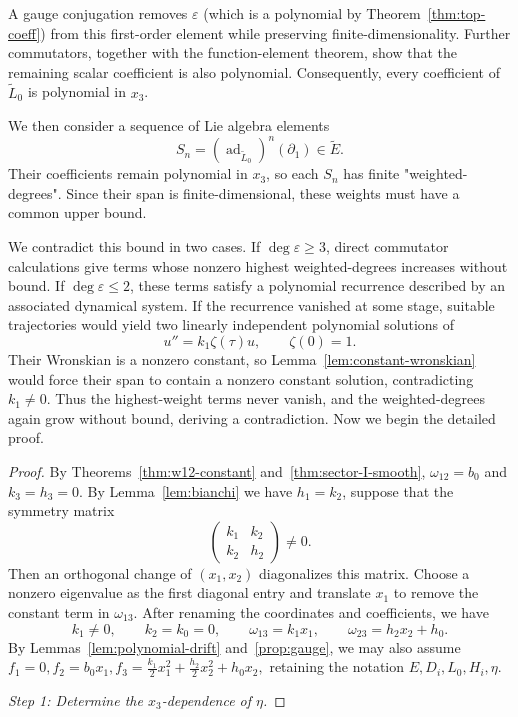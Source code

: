 \documentclass{tCON2e}
\newenvironment{revision}{\begingroup\color{black}}{\endgroup}
\numberwithin{equation}{section}
\theoremstyle{journalplain}
\theoremstyle{journaldef}
\newenvironment{revision}{}{}
\begin{document}
\begin{revision}
A gauge conjugation removes $\varepsilon$ (which is a polynomial by Theorem~\ref{thm:top-coeff}) from this first-order
element while preserving finite-dimensionality.
Further commutators, together with the function-element theorem,
show that the remaining scalar coefficient is also polynomial.
Consequently, every coefficient of $\widetilde L_0$ is polynomial
in $x_3$.

We then consider a sequence of Lie algebra elements
\[
S_n=(\operatorname{ad}_{\widetilde L_0})^n(\partial_1)
\in\widetilde E.
\]
Their coefficients remain polynomial in $x_3$, so each $S_n$
has finite "weighted-degrees". Since their span is finite-dimensional,
these weights must have a common upper bound.

We contradict this bound in two cases.
If $\deg\varepsilon\ge3$, direct commutator calculations give
terms whose nonzero highest weighted-degrees increases without bound.
If $\deg\varepsilon\le2$, these terms satisfy a polynomial recurrence
described by an associated dynamical system.
If the recurrence vanished at some stage, suitable trajectories
would yield two linearly independent polynomial solutions of
\[
u''=k_1\zeta(\tau)u,\qquad \zeta(0)=1.
\]
Their Wronskian is a nonzero constant, so
Lemma~\ref{lem:constant-wronskian} would force their span to
contain a nonzero constant solution, contradicting $k_1\ne0$.
Thus the highest-weight terms never vanish, and the weighted-degrees
again grow without bound, deriving a contradiction. Now we begin the detailed proof.

\begin{proof}
By Theorems~\ref{thm:w12-constant} and~\ref{thm:sector-I-smooth},
$\omega_{12}=b_0$ and $k_3=h_3=0$. By Lemma~\ref{lem:bianchi} we have $h_1 = k_2$,
suppose that the symmetry matrix
\[
\begin{pmatrix}k_1&k_2\\k_2&h_2\end{pmatrix}\ne0.
\]
Then an orthogonal change of $(x_1,x_2)$ diagonalizes this matrix.
Choose a nonzero eigenvalue as the first diagonal entry and
translate $x_1$ to remove the constant term in $\omega_{13}$.
After renaming the coordinates and coefficients, we have
\[
k_1\ne0,\qquad k_2=k_0=0,\qquad
\omega_{13}=k_1x_1,\qquad \omega_{23}=h_2x_2+h_0.
\]
By Lemmas~\ref{lem:polynomial-drift} and~\ref{prop:gauge},
we may also assume
\(
f_1=0,f_2=b_0x_1,
f_3=\frac{k_1}{2}x_1^2+\frac{h_2}{2}x_2^2+h_0x_2,
\)
retaining the notation $E,D_i,L_0,H_i,\eta$.

\medskip
\noindent\emph{Step 1: Determine the $x_3$-dependence of $\eta$.}


\end{proof}
\end{revision}
\end{document}
